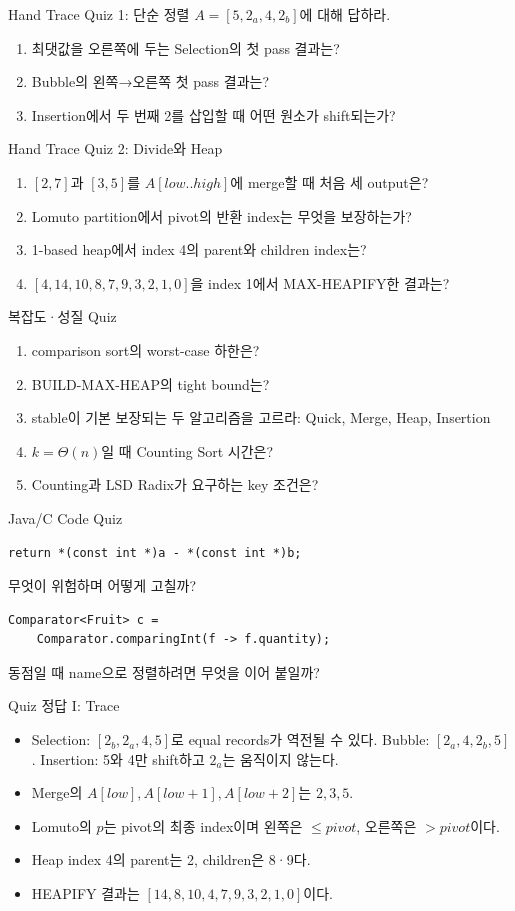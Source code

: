\begin{frame}{Hand Trace Quiz 1: 단순 정렬}
$A=[5,2_a,4,2_b]$에 대해 답하라.
\begin{enumerate}\item 최댓값을 오른쪽에 두는 Selection의 첫 pass 결과는?\item Bubble의 왼쪽→오른쪽 첫 pass 결과는?\item Insertion에서 두 번째 2를 삽입할 때 어떤 원소가 shift되는가?\end{enumerate}
\end{frame}
\begin{frame}{Hand Trace Quiz 2: Divide와 Heap}
\begin{enumerate}\item $[2,7]$과 $[3,5]$를 $A[low..high]$에 merge할 때 처음 세 output은?\item Lomuto partition에서 pivot의 반환 index는 무엇을 보장하는가?\item 1-based heap에서 index 4의 parent와 children index는?\item $[4,14,10,8,7,9,3,2,1,0]$을 index 1에서 MAX-HEAPIFY한 결과는?\end{enumerate}
\end{frame}
\begin{frame}{복잡도·성질 Quiz}
\begin{enumerate}\item comparison sort의 worst-case 하한은?\item BUILD-MAX-HEAP의 tight bound는?\item stable이 기본 보장되는 두 알고리즘을 고르라: Quick, Merge, Heap, Insertion\item $k=\Theta(n)$일 때 Counting Sort 시간은?\item Counting과 LSD Radix가 요구하는 key 조건은?\end{enumerate}
\end{frame}
\begin{frame}[fragile]{Java/C Code Quiz}
\begin{lstlisting}[style=ccode]
return *(const int *)a - *(const int *)b;
\end{lstlisting}
무엇이 위험하며 어떻게 고칠까?
\vspace{3mm}
\begin{lstlisting}[style=jcode]
Comparator<Fruit> c =
    Comparator.comparingInt(f -> f.quantity);
\end{lstlisting}
동점일 때 name으로 정렬하려면 무엇을 이어 붙일까?
\end{frame}
\begin{frame}{Quiz 정답 I: Trace}
\begin{itemize}
\item Selection: $[2_b,2_a,4,5]$로 equal records가 역전될 수 있다. Bubble: $[2_a,4,2_b,5]$. Insertion: 5와 4만 shift하고 $2_a$는 움직이지 않는다.
\item Merge의 $A[low],A[low+1],A[low+2]$는 $2,3,5$.
\item Lomuto의 $p$는 pivot의 최종 index이며 왼쪽은 $\le pivot$, 오른쪽은 $>pivot$이다.
\item Heap index 4의 parent는 2, children은 8·9다.
\item HEAPIFY 결과는 $[14,8,10,4,7,9,3,2,1,0]$이다.
\end{itemize}
\end{frame}
